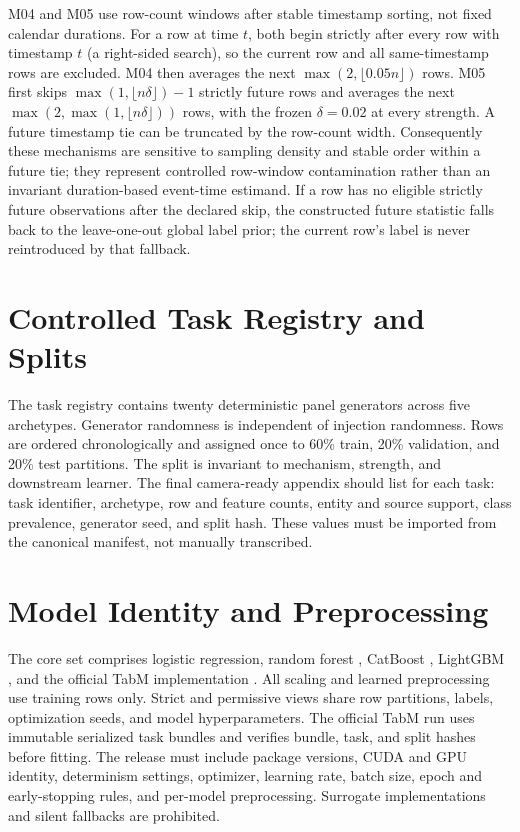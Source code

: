 \documentclass[letterpaper]{article}
\begin{document}
M04 and M05 use row-count windows after stable timestamp sorting, not fixed
calendar durations.  For a row at time $t$, both begin strictly after every row
with timestamp $t$ (a right-sided search), so the current row and all
same-timestamp rows are excluded.  M04 then averages the next
$\max(2,\lfloor0.05n\rfloor)$ rows.  M05 first skips
$\max(1,\lfloor n\delta\rfloor)-1$ strictly future rows and averages the next
$\max(2,\max(1,\lfloor n\delta\rfloor))$ rows, with the frozen
$\delta=0.02$ at every strength.  A future timestamp tie can be truncated by
the row-count width.  Consequently these mechanisms are sensitive to sampling
density and stable order within a future tie; they represent controlled
row-window contamination rather than an invariant duration-based event-time
estimand.  If a row has no eligible strictly future observations after the
declared skip, the constructed future statistic falls back to the leave-one-out
global label prior; the current row's label is never reintroduced by that
fallback.

\section{Controlled Task Registry and Splits}
The task registry contains twenty deterministic panel generators across five
archetypes.  Generator randomness is independent of injection randomness.
Rows are ordered chronologically and assigned once to 60\% train, 20\%
validation, and 20\% test partitions.  The split is invariant to mechanism,
strength, and downstream learner.  The final camera-ready appendix should list
for each task: task identifier, archetype, row and feature counts, entity and
source support, class prevalence, generator seed, and split hash.  These values
must be imported from the canonical manifest, not manually transcribed.

\section{Model Identity and Preprocessing}
The core set comprises logistic regression, random forest
\citep{breiman2001random}, CatBoost \citep{prokhorenkova2018catboost}, LightGBM
\citep{ke2017lightgbm}, and the official TabM implementation
\citep{gorishniy2025tabm}.  All scaling and learned preprocessing
use training rows only.  Strict and permissive views share row partitions,
labels, optimization seeds, and model hyperparameters.  The official TabM run
uses immutable serialized task bundles and verifies bundle, task, and split
hashes before fitting.  The release must include package versions, CUDA and GPU
identity, determinism settings, optimizer, learning rate, batch size, epoch and
early-stopping rules, and per-model preprocessing.  Surrogate implementations
and silent fallbacks are prohibited.
\end{document}
